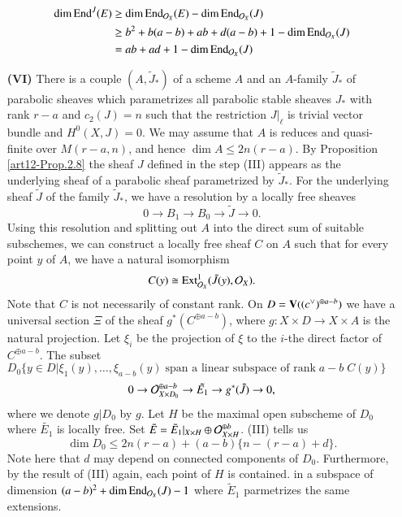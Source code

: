 \begin{itemize}
\begin{align*}
\dim \operatorname{End}^{J}(E) &\geq \dim \operatorname{End}_{\mathcal{O}_{X}}(E)-\dim \operatorname{End}_{\mathcal{O}_{X}}(J)\\
 &\geq b^{2} + b(a-b) + ab + d(a-b) + 1 -\dim \operatorname{End}_{\mathcal{O}_{X}}(J)\\
 &= ab + ad + 1 - \dim\operatorname{End}_{\mathcal{O}_{X}}(J)
\end{align*}

\item[\bf(VI)] There is a couple $(A, \tilde{J}_{*})$ of a scheme $A$ and an $A$-family $\tilde{J}_{*}$ of parabolic sheaves which parametrizes all parabolic stable sheaves $J_{*}$ with rank $r-a$ and $c_{2}(J)=n$ such that the restriction $J|_{\ell}$ is trivial vector bundle and $H^{0}(X, J)=0$. We may assume that $A$ is reduces and quasi-finite over $M(r-a, n)$, and hence $\dim A\leq 2n(r-a)$. By Proposition \ref{art12-Prop.2.8} the sheaf $J$ defined in the step (III) appears as the underlying sheaf of a parabolic sheaf parametrized by $\tilde{J}_{*}$. For the underlying sheaf $\tilde{J}$ of the family $\tilde{J}_{*}$, we have a resolution by a locally free sheaves
$$
0 \rightarrow B_{1} \rightarrow B_{0} \rightarrow \tilde{J} \rightarrow 0.
$$
Using this resolution and splitting out $A$ into the direct sum of suitable subschemes, we can construct a locally free sheaf $C$ on $A$ such that for every point $y$ of $A$,  we have a natural isomorphism
$$
C(y) \cong \operatorname{Ext}_{\mathcal{O}_{X}}^{1} (\tilde{J}(y), \mathcal{O}_{X}).
$$
Note that $C$ is not necessarily of constant rank. On $D= \mathbf{V}((c^{\vee})^{\oplus a-b})$ we have a universal section $\Xi$ of the sheaf $g^{*}(C^{\oplus a-b})$, where $g : X\times D \rightarrow X\times A$ is the natural projection. Let $\xi_{i}$ be the projection of $\xi$ to the $i$-the direct factor of $C^{\oplus a-b}$. The subset $D_{0}\{y \in D | \xi_{1}(y), \ldots, \xi_{a-b}(y)\; \text{span a linear subspace of rank}\; a-b\; C(y)\}$
$$
0 \rightarrow \mathcal{O}_{X\times D_{0}}^{\oplus a-b} \rightarrow \tilde{E_{1}} \rightarrow g^{*} (\tilde{J})\rightarrow 0,
$$
where we denote $g |D_{0}$ by $g$. Let $H$ be the maximal open subscheme of $D_{0}$ where $\tilde{E_{1}}$ is locally free. Set $\tilde{E} = \tilde{E}_{1}|_{X\times H} \oplus \mathcal{O}_{X \times H}^{\oplus b}$. (III) tells us
$$
\dim D_{0}\leq 2n(r-a) + (a-b) \{n-(r-a) + d\}.
$$
Note here that $d$ may depend on connected components of $D_{0}$. Furthermore, by the result of (III) again, each point of $H$ is contained. in a subspace of dimension $(a-b)^{2} + \dim \operatorname{End}_{\mathcal{O}_{X}}(J)-1$ where $\tilde{E}_{1}$ parmetrizes the same extensions.


\end{itemize}
